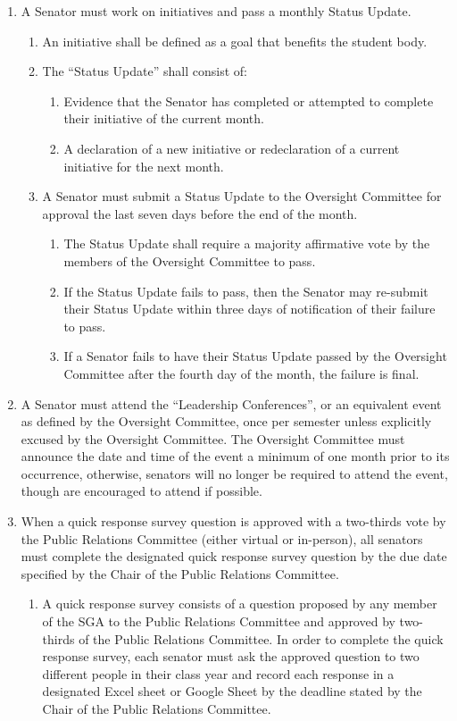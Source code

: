 \documentclass[12pt]{scrreprt}
\begin{document}
\begin{enumerate}
    \item A Senator must work on initiatives and pass a monthly Status Update.
    \begin{enumerate}
        \item An initiative shall be defined as a goal that benefits the student body.
        \item The “Status Update” shall consist of:
        \begin{enumerate}
            \item Evidence that the Senator has completed or attempted to complete their initiative of the current month.
            \item A declaration of a new initiative or redeclaration of a current initiative for the next month.
        \end{enumerate}
        \item A Senator must submit a Status Update to the Oversight Committee for approval the last seven days before the end of the month.
        \begin{enumerate}
            \item The Status Update shall require a majority affirmative vote by the members of the Oversight Committee to pass.
            \item If the Status Update fails to pass, then the Senator may re-submit their Status Update within three days of notification of their failure to pass.
            \item If a Senator fails to have their Status Update passed by the Oversight Committee after the fourth day of the month, the failure is final.
        \end{enumerate}
    \end{enumerate}
    \item A Senator must attend the “Leadership Conferences”, or an equivalent event as defined by
the Oversight Committee, once per semester unless explicitly excused by the Oversight
Committee. The Oversight Committee must announce the date and time of the event a
minimum of one month prior to its occurrence, otherwise, senators will no longer be required to
attend the event, though are encouraged to attend if possible.
    \item When a quick response survey question is approved with a two-thirds vote by the
Public Relations Committee (either virtual or in-person), all senators must complete the designated quick response survey question by the due date specified by the Chair of
the Public Relations Committee.
    \begin{enumerate}
        \item A quick response survey consists of a question proposed by any member of
the SGA to the Public Relations Committee and approved by two-thirds of the
Public Relations Committee. In order to complete the quick response survey,
each senator must ask the approved question to two different people in their
class year and record each response in a designated Excel sheet or Google
Sheet by the deadline stated by the Chair of the Public Relations Committee.
    \end{enumerate}
\end{enumerate}
\end{document}
